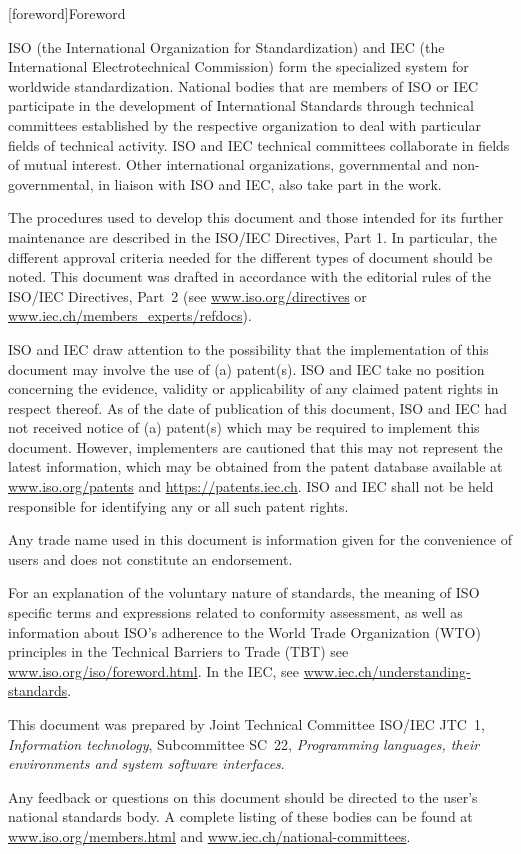 
[foreword]{Foreword}

ISO (the International Organization for Standardization) and IEC (the International Electrotechnical Commission) form the specialized system for worldwide standardization. National bodies that are members of ISO or IEC participate in the development of International Standards through technical committees established by the respective organization to deal with particular fields of technical activity. ISO and IEC technical committees collaborate in fields of mutual interest. Other international organizations, governmental and non-governmental, in liaison with ISO and IEC, also take part in the work.

The procedures used to develop this document and those intended for its further maintenance are described in the ISO/IEC Directives, Part 1. In particular, the different approval criteria needed for the different types of document should be noted. This document was drafted in accordance with the editorial rules of the ISO/IEC Directives, Part 2 (see \url{www.iso.org/directives} or \url{www.iec.ch/members_experts/refdocs}).

ISO and IEC draw attention to the possibility that the implementation of this document may involve the use of (a) patent(s). ISO and IEC take no position concerning the evidence, validity or applicability of any claimed patent rights in respect thereof. As of the date of publication of this document, ISO and IEC had not received notice of (a) patent(s) which may be required to implement this document. However, implementers are cautioned that this may not represent the latest information, which may be obtained from the patent database available at \url{www.iso.org/patents} and \url{https://patents.iec.ch}. ISO and IEC shall not be held responsible for identifying any or all such patent rights.

Any trade name used in this document is information given for the convenience of users and does not constitute an endorsement.

For an explanation of the voluntary nature of standards, the meaning of ISO specific terms and expressions related to conformity assessment, as well as information about ISO's adherence to the World Trade Organization (WTO) principles in the Technical Barriers to Trade (TBT) see \url{www.iso.org/iso/foreword.html}. In the IEC, see \url{www.iec.ch/understanding-standards}.

This document was prepared by Joint Technical Committee ISO/IEC JTC 1, \emph{Information technology}, Subcommittee SC 22, \emph{Programming languages, their environments and system software interfaces}.

Any feedback or questions on this document should be directed to the user’s national standards body. A complete listing of these bodies can be found at \url{www.iso.org/members.html} and \url{www.iec.ch/national-committees}.
